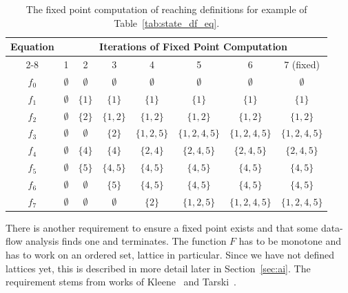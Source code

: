 \begin{table}[tb]
\begin{center}
\begin{tabular}{|c||c|c|c|c|c|c|c|} \hline
\multirow{2}{2.7em}{\textbf{Equa\-tion}} &
  \multicolumn{7}{c|}{\textbf{Iterations of Fixed Point Computation}}
  \\ \cline{2-8}
& 1 & 2 & 3 & 4 & 5 & 6 & 7 (fixed) \\ \hline\hline
$f_0$ & $\emptyset$ & $\emptyset$ & $\emptyset$ & $\emptyset$ & $\emptyset$ &
  $\emptyset$ & $\emptyset$ \\ \hline
$f_1$ & $\emptyset$ & $\{1\}$ & $\{1\}$ & $\{1\}$ & $\{1\}$ & $\{1\}$ &
  $\{1\}$ \\ \hline
$f_2$ & $\emptyset$ & $\{2\}$ & $\{1,2\}$ & $\{1,2\}$ & $\{1,2\}$ &
  $\{1,2\}$ & $\{1,2\}$ \\ \hline
$f_3$ & $\emptyset$ & $\emptyset$ & $\{2\}$ & $\{1,2,5\}$ & $\{1,2,4,5\}$ &
  $\{1,2,4,5\}$ & $\{1,2,4,5\}$ \\ \hline
$f_4$ & $\emptyset$ & $\{4\}$ & $\{4\}$ & $\{2,4\}$ & $\{2,4,5\}$ &
  $\{2,4,5\}$ & $\{2,4,5\}$ \\ \hline
$f_5$ & $\emptyset$ & $\{5\}$ & $\{4,5\}$ & $\{4,5\}$ & $\{4,5\}$ &
  $\{4,5\}$ & $\{4,5\}$ \\ \hline
$f_6$ & $\emptyset$ & $\emptyset$ & $\{5\}$ & $\{4,5\}$ & $\{4,5\}$ &
  $\{4,5\}$ & $\{4,5\}$ \\ \hline
$f_7$ & $\emptyset$ & $\emptyset$ & $\emptyset$ & $\{2\}$ & $\{1,2,5\}$ &
  $\{1,2,4,5\}$ & $\{1,2,4,5\}$ \\ \hline
\end{tabular}
\end{center}
  \caption{The fixed point computation of reaching definitions for example of
    Table~\ref{tab:state_df_eq}.}
  \label{tab:state_df_fp}
\end{table}

There is another requirement to ensure a fixed point exists and that some
data-flow analysis finds one and terminates. The function $F$ has to be
monotone and has to work on an ordered set, lattice in particular.  Since we
have not defined lattices yet, this is described in more detail later in
Section~\ref{sec:ai}. The requirement stems from works of Kleene~\cite[pages
348--349]{kleene} and Tarski~\cite{tarski}.

